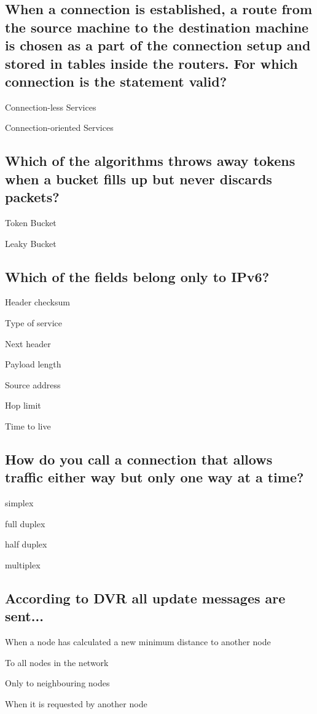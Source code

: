 \documentclass[a4paper,
			llpt,
			solution,
			accentcolor=tud2d,
			colorbacktitle
			]
			{tudexercise}
\newcommand{\8}{$\infty$}
\begin{document}
\subsection{When a connection is established, a route from the source machine to the destination machine is chosen as a part of the connection setup and stored in tables inside the routers. For which connection is the statement valid?}
\begin{compactenum}
\item \textcolor{litegray}{Connection-less Services}
\item \textcolor{tud2d}{Connection-oriented Services}
\end{compactenum}
\subsection{Which of the algorithms throws away tokens when a bucket fills up but never discards packets?}
\begin{compactenum}
\item \textcolor{tud2d}{Token Bucket}
\item \textcolor{litegray}{Leaky Bucket}
\end{compactenum}
\subsection{Which of the fields belong only to IPv6?}
\begin{compactenum}
\item Header checksum
\item Type of service
\item Next header
\item Payload length
\item Source address
\item Hop limit
\item Time to live
\end{compactenum}
\subsection{How do you call a connection that allows traffic either way but only one way at a time?}
\begin{compactenum}
\item \textcolor{litegray}{simplex}
\item \textcolor{litegray}{full duplex}
\item \textcolor{tud2d}{half duplex}
\item \textcolor{litegray}{multiplex}
\end{compactenum}
\subsection{According to DVR all update messages are sent...}
\begin{compactenum}
\item When a node has calculated a new minimum distance to another node
\item To all nodes in the network
\item Only to neighbouring nodes
\item When it is requested by another node
\end{compactenum}
\end{document}
